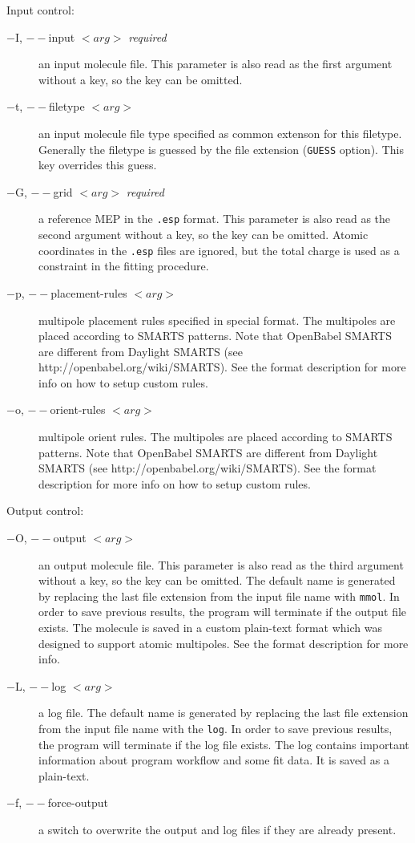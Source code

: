 \documentclass[10pt,a4paper]{article}
\begin{document}
Input control:
\begin{description}
\item[$-$I, $--$input $<arg>$ \textit{required}] an input molecule file. This parameter is
also read as the first argument without a key, so the key can be omitted.
\item[$-$t, $--$filetype $<arg>$] an input molecule file type specified as common extenson
for this filetype. Generally the filetype is guessed by the file extension 
(\lstinline{GUESS} option). This key overrides this guess.
\item[$-$G, $--$grid $<arg>$ \textit{required}] a reference MEP in the \lstinline{.esp} 
format. 
This parameter is also read as the second argument without a key, so the key can be 
omitted. Atomic coordinates in the \lstinline{.esp} files are ignored, but the total charge 
is used as a constraint in the fitting procedure. 
\item[$-$p, $--$placement-rules $<arg>$] multipole placement rules specified 
in special format.
The multipoles are placed according to SMARTS patterns. Note that OpenBabel SMARTS are
different from Daylight SMARTS (see http://openbabel.org/wiki/SMARTS). See the format
description for more info on how to setup custom rules.
\item[$-$o, $--$orient-rules $<arg>$] multipole orient rules. The multipoles are placed
according to SMARTS patterns. Note that OpenBabel SMARTS are 
different from Daylight SMARTS (see http://openbabel.org/wiki/SMARTS). See the format
description for more info on how to setup custom rules.
\end{description}

Output control:
\begin{description}
\item[$-$O, $--$output $<arg>$] an output molecule file. This parameter is 
also read as the third argument without a key, so the key can be omitted. 
The default name is generated by
replacing the last file extension from the input file name with \lstinline{mmol}. In order 
to save previous results, the program will terminate if the output file exists. The molecule
is saved in a custom plain-text format which was designed to support atomic multipoles. 
See the format description for more info.
\item[$-$L, $--$log $<arg>$] a log file. The default name is generated by 
replacing the last file extension from the input file name with the \lstinline{log}. 
In order to 
save previous results, the program will terminate if the log file exists. The log
contains important information about program workflow and some fit data. It is
saved as a plain-text.
\item[$-$f, $--$force-output] a switch to overwrite the output and log files if they are
already present. 
\end{description}
\end{document}
